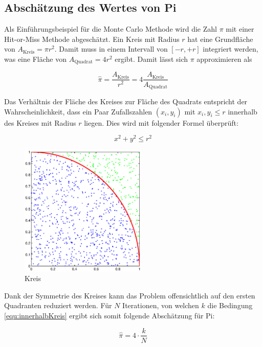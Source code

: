 \documentclass{book}
\begin{document}
\begin{refsection}
\subsection{Abschätzung des Wertes von Pi}
Als Einführungsbeispiel für die Monte Carlo Methode wird die Zahl $\pi$ mit einer Hit-or-Miss Methode abgeschätzt. Ein Kreis mit Radius $r$ hat eine Grundfläche von $A_{\text{Kreis}} = \pi r^{2}$.  Damit muss in einem Intervall von $[-r,+r]$ integriert werden, was eine Fläche von $A_{\text{Quadrat}} = 4r^2$ ergibt. Damit lässt sich $\pi$ approximieren als

\begin{equation}
	\hat{\pi} = \frac{A_{\text{Kreis}}}{r^2} = 4 \frac{A_{\text{Kreis}}}{A_{\text{Quadrat}}}
\end{equation}

Das Verhältnis der Fläche des Kreises zur Fläche des Quadrats entspricht der Wahrscheinlichkeit, dass ein Paar Zufallszahlen $(x_i,y_i)$ mit $x_i,y_i \leq r$ innerhalb des Kreises mit Radius $r$ liegen. Dies wird mit folgender Formel überprüft:

\begin{equation}
	x^2 + y^2 \leq r^2
	\label{equ:innerhalbKreis}
\end{equation}

\begin{figure}[htbp]
	\centering
	\includegraphics[width=6cm]{images/kreis_hitmiss.eps}
	\caption{Kreis}
	\label{fig:KreisHitMiss}
\end{figure}

Dank der Symmetrie des Kreises kann das Problem offensichtlich auf den ersten Quadranten reduziert werden. Für $N$ Iterationen, von welchen $k$ die Bedingung \ref{equ:innerhalbKreis} ergibt sich somit folgende Abschätzung für Pi:

\begin{equation}
	\hat{\pi} = 4 \cdot \frac{k}{N}
\end{equation}




\end{refsection}
\end{document}
